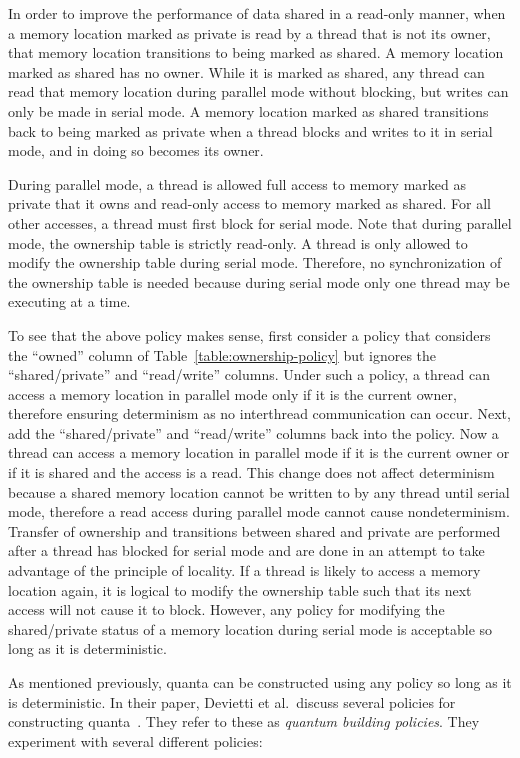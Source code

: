 In order to improve the performance of data shared in a read-only
manner, when a memory location marked as private is read by a thread
that is not its owner, that memory location transitions to being
marked as shared.  A memory location marked as shared has no owner.
While it is marked as shared, any thread can read that memory location
during parallel mode without blocking, but writes can only be made in
serial mode.  A memory location marked as shared transitions back to
being marked as private when a thread blocks and writes to it in
serial mode, and in doing so becomes its owner.

During parallel mode, a thread is allowed full access to memory marked
as private that it owns and read-only access to memory marked as
shared.  For all other accesses, a thread must first block for serial
mode.  Note that during parallel mode, the ownership table is strictly
read-only.  A thread is only allowed to modify the ownership table
during serial mode.  Therefore, no synchronization of the ownership
table is needed because during serial mode only one thread may be
executing at a time.

To see that the above policy makes sense, first consider a policy that
considers the ``owned'' column of Table~\ref{table:ownership-policy}
but ignores the ``shared/private'' and ``read/write'' columns.  Under
such a policy, a thread can access a memory location in parallel mode
only if it is the current owner, therefore ensuring determinism as no
interthread communication can occur.  Next, add the ``shared/private''
and ``read/write'' columns back into the policy.  Now a thread can
access a memory location in parallel mode if it is the current owner
or if it is shared and the access is a read.  This change does not
affect determinism because a shared memory location cannot be written
to by any thread until serial mode, therefore a read access during
parallel mode cannot cause nondeterminism.  Transfer of ownership and
transitions between shared and private are performed after a thread
has blocked for serial mode and are done in an attempt to take
advantage of the principle of locality.  If a thread is likely to
access a memory location again, it is logical to modify the ownership
table such that its next access will not cause it to block.  However,
any policy for modifying the shared/private status of a memory
location during serial mode is acceptable so long as it is
deterministic.

As mentioned previously, quanta can be constructed using any policy so
long as it is deterministic.  In their paper, Devietti et al.\ discuss
several policies for constructing quanta~\cite{dmp}.  They refer to
these as \emph{quantum building policies}.  They experiment with
several different policies:

